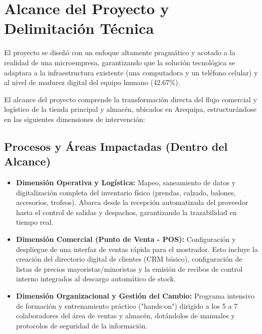 \section{Alcance del Proyecto y Delimitación Técnica}

El proyecto se diseñó con un enfoque altamente pragmático y acotado a la realidad de una microempresa, garantizando que la solución tecnológica se adaptara a la infraestructura existente (una computadora y un teléfono celular) y al nivel de madurez digital del equipo humano (42.67\%). 

El alcance del proyecto comprende la transformación directa del flujo comercial y logístico de la tienda principal y almacén, ubicados en Arequipa, estructurándose en las siguientes dimensiones de intervención:

\subsection{Procesos y Áreas Impactadas (Dentro del Alcance)}
\begin{itemize}
    \item \textbf{Dimensión Operativa y Logística:} Mapeo, saneamiento de datos y digitalización completa del inventario físico (prendas, calzado, balones, accesorios, trofeos). Abarca desde la recepción automatizada del proveedor hasta el control de salidas y despachos, garantizando la trazabilidad en tiempo real.
    \item \textbf{Dimensión Comercial (Punto de Venta - POS):} Configuración y despliegue de una interfaz de ventas rápida para el mostrador. Esto incluye la creación del directorio digital de clientes (CRM básico), configuración de listas de precios mayoristas/minoristas y la emisión de recibos de control interno integrados al descargo automático de stock.

    \item \textbf{Dimensión Organizacional y Gestión del Cambio:} Programa intensivo de formación y entrenamiento práctico ("hands-on") dirigido a los 5 a 7 colaboradores del área de ventas y almacén, dotándolos de manuales y protocolos de seguridad de la información.
\end{itemize}

